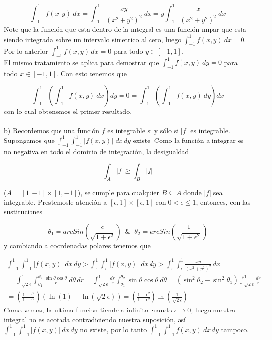 \documentclass[12pt]{article}
\begin{document}
    \[\int_{-1}^{1}f(x,y)\:dx=\int_{-1}^{1}\frac{xy}{(x^2+y^2)^2}\:dx=y\int_{-1}^{1}\frac{x}{(x^2+y^2)^2}\:dx\]
    Note que la funci\'on que esta dentro de la integral es una funci\'on impar que esta siendo
    integrada sobre un intervalo simetrico al cero, luego $\int_{-1}^{1}f(x,y)\:dx=0$. Por lo 
    anterior $\int_{-1}^{1}f(x,y)\:dx=0$ para todo $y\in [-1,1]$.
    \\ 
    El mismo tratamiento se aplica para demostrar que $\int_{-1}^{1}f(x,y)\:dy=0$ para todo $x\in [-1,1]$.
    Con esto tenemos que 

    \[\int_{-1}^{1}\left(\int_{-1}^{1}f(x,y)\:dx\right)dy=0=\int_{-1}^{1}\left(\int_{-1}^{1}f(x,y)\:dy\right)dx\]
    con lo cual obtenemos el primer resultado.
    \\ \\
    b) Recordemos que una funci\'on $f$ es integrable si y s\'olo si $|f|$ es integrable. 
    Supongamos que $\int _{-1}^{1}\int_{-1}^{1}|f(x,y)|\;dx\,dy$ existe. Como la funci\'on a 
    integrar es no negativa en todo el dominio de integraci\'on, la desigualdad

    \[\int_A |f| \geq \int_B |f|\]
    
    ($A=[1,-1]\times [1,-1]$), se cumple para cualquier $B\subseteq A$ donde $|f|$ sea integrable.
    Prestemosle atenci\'on a $[\epsilon,1]\times[\epsilon,1] \; \mathrm{con} \; 0<\epsilon \leq 1$,
    entonces, con las sustituciones 

    $$\theta_{1}=arcSin(\frac{\epsilon}{\sqrt{1+\epsilon^2}}) \;\; \& \;\; \theta_{2}=arcSin(\frac{1}{\sqrt{1+\epsilon^2}})$$
    y cambiando a coordenadas polares tenemos que 

    \begin{gather*}
        \int _{-1}^{1}\int_{-1}^{1}|f(x,y)|\;dx\,dy > \int _{\epsilon}^{1}\int_{\epsilon}^{1}|f(x,y)|\;dx\,dy>\int_{\epsilon}^{1}\int_{\epsilon}^{1}\frac{xy}{(x^2+y^2)^2}\:dx =\\
        =\int_{\sqrt{2}\epsilon}^{1} \int_{\theta_1}^{\theta_2} \frac{\sin\theta\cos\theta }{r}\:d\theta\,dr=
        \int_{\sqrt{2}\epsilon}^{1} \frac{dr}{r} \int_{\theta_1}^{\theta_2} \sin \theta \cos \theta\:d\theta = 
        \left(\sin^2 \theta_2-\sin^2 \theta_1\right)\int_{\sqrt{2}\epsilon}^{1} \frac{dr}{r} = \\
        =\left(\frac{1-\epsilon^2}{1+\epsilon^2}\right)(\ln(1)-\ln(\sqrt{2}\epsilon))=\left(\frac{1-\epsilon^2}{1+\epsilon^2}\right)\ln\left(\frac{1}{\sqrt{2}\epsilon}\right)
    \end{gather*}
    Como vemos, la ultima funcion tiende a infinito cuando $\epsilon \rightarrow 0$, luego nuestra
    integral no es acotada contradiciendo nuestra suposici\'on, as\'i $\int_{-1}^1 \int_{-1}^1 |f(x,y)|\:dx\,dy$ 
    no existe, por lo tanto $\int_{-1}^1 \int_{-1}^1 f(x,y)\:dx\,dy$ tampoco.
    \\ \\
\end{document}
